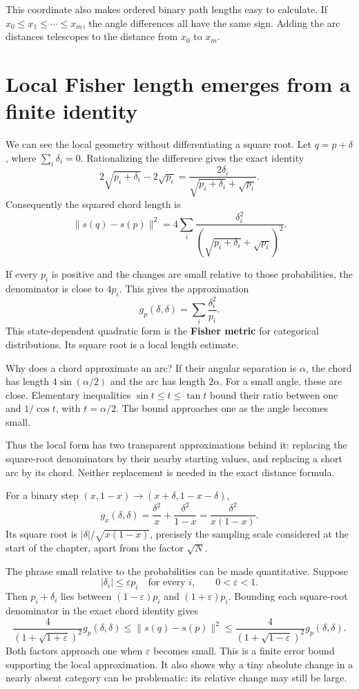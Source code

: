\documentclass[11pt,oneside,openany]{book}
\theoremstyle{definition}
\theoremstyle{remark}
\numberwithin{equation}{chapter}
\begin{document}
This coordinate also makes ordered binary path lengths easy to calculate. If \(x_0\leq x_1\leq\cdots\leq x_m\), the angle differences all have the same sign. Adding the arc distances telescopes to the distance from \(x_0\) to \(x_m\).

\section{Local Fisher length emerges from a finite identity}\label{ch07-local-fisher-length-emerges-from-a-finite-identity}

We can see the local geometry without differentiating a square root. Let \(q=p+\delta\), where \(\sum_i\delta_i=0\). Rationalizing the difference gives the exact identity \[2\sqrt{p_i+\delta_i}-2\sqrt{p_i}
=\frac{2\delta_i}{\sqrt{p_i+\delta_i}+\sqrt{p_i}}.\] Consequently the squared chord length is \[\|s(q)-s(p)\|^2
=4\sum_i\frac{\delta_i^2}
{(\sqrt{p_i+\delta_i}+\sqrt{p_i})^2}.\]

If every \(p_i\) is positive and the changes are small relative to those probabilities, the denominator is close to \(4p_i\). This gives the approximation \[\boxed{g_p(\delta,\delta)=\sum_i\frac{\delta_i^2}{p_i}.}\] This state-dependent quadratic form is the \textbf{Fisher metric} for categorical distributions. Its square root is a local length estimate.

Why does a chord approximate an arc? If their angular separation is \(\alpha\), the chord has length \(4\sin(\alpha/2)\) and the arc has length \(2\alpha\). For a small angle, these are close. Elementary inequalities \(\sin t\leq t\leq\tan t\) bound their ratio between one and \(1/\cos t\), with \(t=\alpha/2\). The bound approaches one as the angle becomes small.

Thus the local form has two transparent approximations behind it: replacing the square-root denominators by their nearby starting values, and replacing a short arc by its chord. Neither replacement is needed in the exact distance formula.

For a binary step \((x,1-x)\to(x+\delta,1-x-\delta)\), \[g_x(\delta,\delta)=\frac{\delta^2}{x}+\frac{\delta^2}{1-x}
=\frac{\delta^2}{x(1-x)}.\] Its square root is \(|\delta|/\sqrt{x(1-x)}\), precisely the sampling scale considered at the start of the chapter, apart from the factor \(\sqrt N\).

The phrase small relative to the probabilities can be made quantitative. Suppose \[|\delta_i|\leq\varepsilon p_i\quad\text{for every }i,\qquad 0<\varepsilon<1.\] Then \(p_i+\delta_i\) lies between \((1-\varepsilon)p_i\) and \((1+\varepsilon)p_i\). Bounding each square-root denominator in the exact chord identity gives \[\frac{4}{(1+\sqrt{1+\varepsilon})^2}g_p(\delta,\delta)
\leq\|s(q)-s(p)\|^2
\leq\frac{4}{(1+\sqrt{1-\varepsilon})^2}g_p(\delta,\delta).\] Both factors approach one when \(\varepsilon\) becomes small. This is a finite error bound supporting the local approximation. It also shows why a tiny absolute change in a nearly absent category can be problematic: its relative change may still be large.
\end{document}
